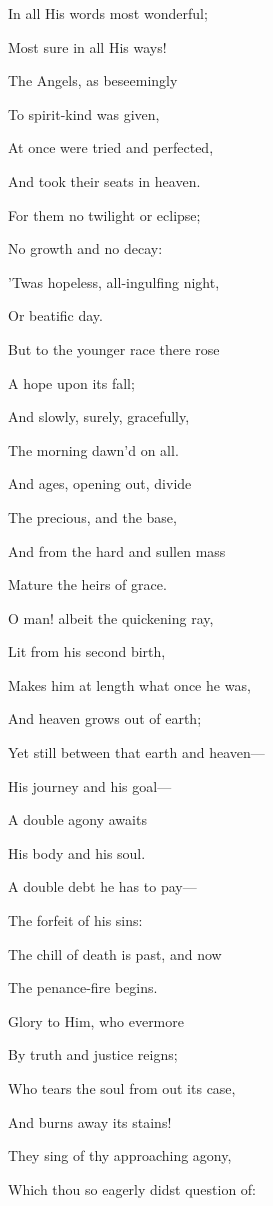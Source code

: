 In all
His words most wonderful;

Most sure in all His ways!

The
Angels, as beseemingly

To spirit-kind was given,

At once
were tried and perfected,

And took their seats in heaven.

For them
no twilight or eclipse;

No growth and no decay:

'Twas
hopeless, all-ingulfing night,

Or beatific day.

But to
the younger race there rose

A hope upon its fall;

And
slowly, surely, gracefully,

The morning dawn'd on all.

And ages,
opening out, divide

The precious, and the base,

And
from the hard and sullen mass

Mature the heirs of grace. 

O man!
albeit the quickening ray,

Lit from his second birth,

Makes
him at length what once he was,

And heaven grows out of earth;

Yet still
between that earth and heaven—

His journey and his goal—

A
double agony awaits

His body and his soul.

A double
debt he has to pay—

The forfeit of his sins:

The
chill of death is past, and now

The penance-fire begins.

Glory to
Him, who evermore

By truth and justice reigns;

Who
tears the soul from out its case,

And burns away its stains!


They sing of thy approaching agony,

Which thou so eagerly didst question of:

